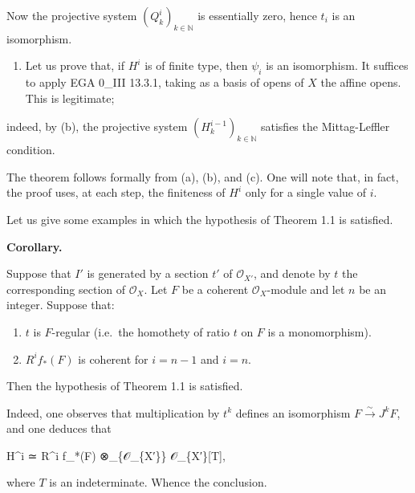 \documentclass[
]{article}
\newenvironment{Shaded}{}{}
\newcommand{\NormalTok}[1]{#1}
\providecommand{\tightlist}{%
  \setlength{\itemsep}{0pt}\setlength{\parskip}{0pt}}
\begin{document}
Now the projective system \((Q^{i}_{k})_{k \in \mathbb{N}}\) is
essentially zero, hence \(t_{i}\) is an isomorphism.

\begin{enumerate}
\def\labelenumi{(\alph{enumi})}
\setcounter{enumi}{2}
\tightlist
\item
  Let us prove that, if \(H^{i}\) is of finite type, then \(\psi_{i}\)
  is an isomorphism. It suffices to apply EGA 0\_III 13.3.1, taking as a
  basis of opens of \(X\) the affine opens. This is legitimate;
\end{enumerate}

indeed, by (b), the projective system
\((H^{i-1}_{k})_{k \in \mathbb{N}}\) satisfies the Mittag-Leffler
condition.

The theorem follows formally from (a), (b), and (c). One will note that,
in fact, the proof uses, at each step, the finiteness of \(H^{i}\) only
for a single value of \(i\).

Let us give some examples in which the hypothesis of Theorem 1.1 is
satisfied.

\textbf{Corollary.}

Suppose that \(I'\) is generated by a section \(t'\) of
\(\mathcal{O}_{X'}\), and denote by \(t\) the corresponding section of
\(\mathcal{O}_{X}\). Let \(F\) be a coherent \(\mathcal{O}_{X}\)-module
and let \(n\) be an integer. Suppose that:

\begin{enumerate}
\def\labelenumi{(\roman{enumi})}
\item
  \(t\) is \(F\)-regular (i.e.~the homothety of ratio \(t\) on \(F\) is
  a monomorphism).
\item
  \(R^{i} f_{*}(F)\) is coherent for \(i = n - 1\) and \(i = n\).
\end{enumerate}

Then the hypothesis of Theorem 1.1 is satisfied.

Indeed, one observes that multiplication by \(t^{k}\) defines an
isomorphism \(F \xrightarrow{\sim} J^{k} F\), and one deduces that

\begin{Shaded}
\begin{Highlighting}[]
\NormalTok{H\^{}i ≃ R\^{}i f\_*(F) ⊗\_\{𝒪\_\{X′\}\} 𝒪\_\{X′\}[T],}
\end{Highlighting}
\end{Shaded}

where \(T\) is an indeterminate. Whence the conclusion.
\end{document}
